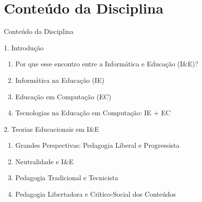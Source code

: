 \documentclass[xcolor=dvipsnames,table]{beamer}
\begin{document}

\section{Conteúdo da Disciplina}
\begin{frame}{Conteúdo da Disciplina}
    \begin{block}{1. Introdução}
        \begin{enumerate}
            \item[a)] Por que esse encontro entre a Informática e Educação (I\&E)?
            \item[b)] Informática na Educação (IE)
            \item[c)] Educação em Computação (EC)
            \item[d)] Tecnologias na Educação em Computação: IE + EC
        \end{enumerate}
        
    \end{block}  \pause


    \begin{block}{2. Teorias Educacionais em I\&E}
        \begin{enumerate}
            \item[a)] Grandes Perspectivas: Pedagogia Liberal e Progressista
            \item[b)] Neutralidade e I\&E
            \item[c)] Pedagogia Tradicional e Tecnicista
            \item[d)] Pedagogia Libertadora e Crítico-Social dos Conteúdos
        \end{enumerate}
        
    \end{block}
\end{frame}
\end{document}

